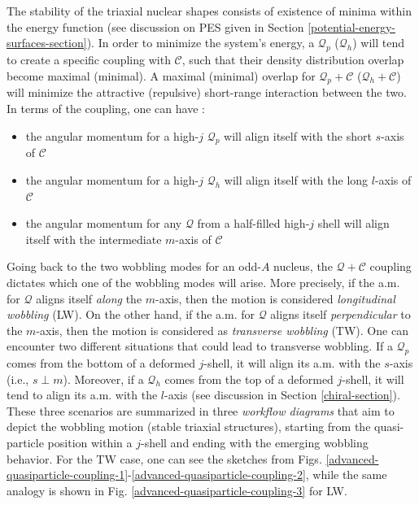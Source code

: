 The stability of the triaxial nuclear shapes consists of existence of minima within the energy function (see discussion on PES given in Section \ref{potential-energy-surfaces-section}). In order to minimize the system's energy, a $\mathcal{Q}_p$ ($\mathcal{Q}_h$) will tend to create a specific coupling with $\mathscr{C}$, such that their density distribution overlap become maximal (minimal). A maximal (minimal) overlap for $\mathcal{Q}_p+\mathscr{C}$ ($\mathcal{Q}_h+\mathscr{C}$) will minimize the attractive (repulsive) short-range interaction between the two. In terms of the coupling, one can have \cite{frauendorf2014transverse}:
\begin{itemize}
    \item the angular momentum for a high-$j$ $\mathcal{Q}_p$ will align itself with the short $s$-axis of $\mathscr{C}$ 
    \item the angular momentum for a high-$j$ $\mathcal{Q}_h$ will align itself with the long $l$-axis of $\mathscr{C}$
    \item the angular momentum for any $\mathcal{Q}$ from a half-filled high-$j$ shell will align itself with the intermediate $m$-axis of $\mathscr{C}$
\end{itemize}
Going back to the two wobbling modes for an odd-$A$ nucleus, the $\mathcal{Q}+\mathscr{C}$ coupling dictates which one of the wobbling modes will arise. More precisely, if the a.m. for $\mathcal{Q}$ aligns itself \emph{along} the $m$-axis, then the motion is considered \emph{longitudinal wobbling} (LW). On the other hand, if the a.m. for $\mathcal{Q}$ aligns itself \emph{perpendicular} to the $m$-axis, then the motion is considered as \emph{transverse wobbling} (TW). One can encounter two different situations that could lead to transverse wobbling. If a $\mathcal{Q}_p$ comes from the bottom of a deformed $j$-shell, it will align its a.m. with the $s$-axis (i.e., $s\perp m$). Moreover, if a $\mathcal{Q}_h$ comes from the top of a deformed $j$-shell, it will tend to align its a.m. with the $l$-axis (see discussion in Section \ref{chiral-section}). These three scenarios are summarized in three \emph{workflow diagrams} that aim to depict the wobbling motion (stable triaxial structures), starting from the quasi-particle position within a $j$-shell and ending with the emerging wobbling behavior. For the TW case, one can see the sketches from Figs. \ref{advanced-quasiparticle-coupling-1}-\ref{advanced-quasiparticle-coupling-2}, while the same analogy is shown in Fig. \ref{advanced-quasiparticle-coupling-3} for LW.
